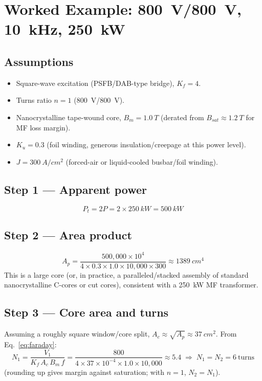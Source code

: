 \documentclass[11pt,a4paper]{article}
\begin{document}
\section{Worked Example: \SI{800}{V}/\SI{800}{V}, \SI{10}{kHz}, \SI{250}{kW}}

\subsection*{Assumptions}
\begin{itemize}
    \item Square-wave excitation (PSFB/DAB-type bridge), $K_f = 4$.
    \item Turns ratio $n=1$ (\SI{800}{V}/\SI{800}{V}).
    \item Nanocrystalline tape-wound core, $B_m = \SI{1.0}{T}$ (derated from
    $B_{sat}\approx\SI{1.2}{T}$ for MF loss margin).
    \item $K_u = 0.3$ (foil winding, generous insulation/creepage at this power level).
    \item $J = \SI{300}{A/cm^2}$ (forced-air or liquid-cooled busbar/foil winding).
\end{itemize}

\subsection*{Step 1 — Apparent power}
\begin{equation}
    P_t = 2P = 2 \times \SI{250}{kW} = \SI{500}{kW}
\end{equation}

\subsection*{Step 2 — Area product}
\begin{equation}
    A_p = \frac{500{,}000 \times 10^4}{4 \times 0.3 \times 1.0 \times 10{,}000 \times 300}
    \approx \SI{1389}{cm^4}
\end{equation}
This is a large core (or, in practice, a paralleled/stacked assembly of standard
nanocrystalline C-cores or cut cores), consistent with a \SI{250}{kW} MF transformer.

\subsection*{Step 3 — Core area and turns}
Assuming a roughly square window/core split, $A_c \approx \sqrt{A_p} \approx \SI{37}{cm^2}$.
From Eq.~\eqref{eq:faraday}:
\begin{equation}
    N_1 = \frac{V_1}{K_f \, A_c \, B_m \, f}
    = \frac{800}{4 \times 37\times10^{-4} \times 1.0 \times 10{,}000}
    \approx 5.4 \;\Rightarrow\; N_1 = N_2 = 6 \ \text{turns}
\end{equation}
(rounding up gives margin against saturation; with $n=1$, $N_2=N_1$).
\end{document}
